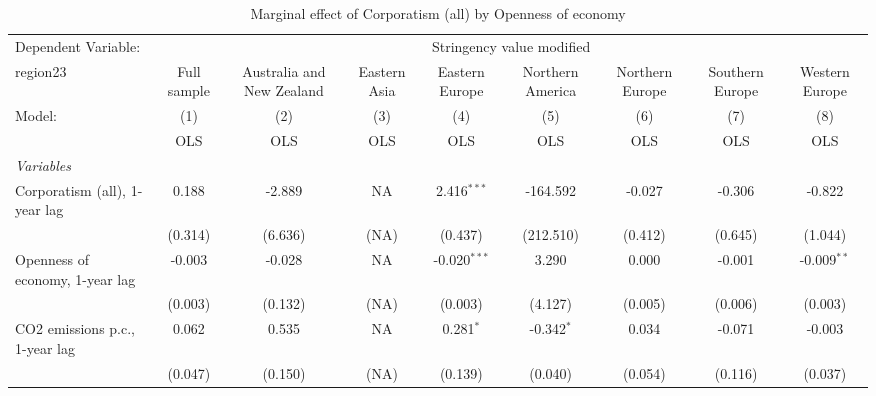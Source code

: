 
\begin{table}[htbp]
   \caption{Marginal effect of Corporatism (all) by Openness of economy}
   \centering
   \begin{tabular}{lcccccccc}
      \toprule
      Dependent Variable: & \multicolumn{8}{c}{Stringency value modified}\\
      region23                                                        & Full sample   & Australia and New Zealand & Eastern Asia & Eastern Europe & Northern America & Northern Europe & Southern Europe & Western Europe \\   
      Model:                                                          & (1)           & (2)                       & (3)          & (4)            & (5)              & (6)             & (7)             & (8)\\  
                                                                      &  OLS          & OLS                       & OLS          & OLS            & OLS              & OLS             & OLS             & OLS\\  
      \midrule
      \emph{Variables}\\
      Corporatism (all), 1-year lag                                   & 0.188         & -2.889                    & NA           & 2.416$^{***}$  & -164.592         & -0.027          & -0.306          & -0.822\\   
                                                                      & (0.314)       & (6.636)                   & (NA)         & (0.437)        & (212.510)        & (0.412)         & (0.645)         & (1.044)\\   
      Openness of economy, 1-year lag                                 & -0.003        & -0.028                    & NA           & -0.020$^{***}$ & 3.290            & 0.000           & -0.001          & -0.009$^{**}$\\   
                                                                      & (0.003)       & (0.132)                   & (NA)         & (0.003)        & (4.127)          & (0.005)         & (0.006)         & (0.003)\\   
      CO2 emissions p.c., 1-year lag                                  & 0.062         & 0.535                     & NA           & 0.281$^{*}$    & -0.342$^{*}$     & 0.034           & -0.071          & -0.003\\   
                                                                      & (0.047)       & (0.150)                   & (NA)         & (0.139)        & (0.040)          & (0.054)         & (0.116)         & (0.037)\\   

\end{tabular}
\end{table}
